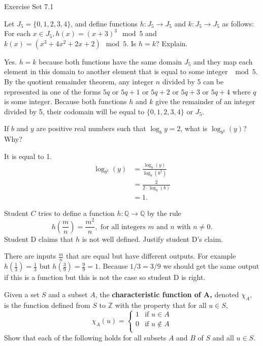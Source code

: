 \documentclass[12pt,letterpaper, onecolumn]{exam}
\begin{document}
	\centerline{Exercise Set 7.1}
\begin{questions}
	\setcounter{question}{13}\question Let $J_5=\{0,1,2,3,4\}$, and define functions $h:J_5\rightarrow J_5$ and $k:J_5 \rightarrow J_5$ as follows: For each $x\in J_5, h(x)=(x+3)^3\mod 5$ and $k(x)=(x^3+4x^2+2x+2)\mod5.$ Is $h=k$? Explain.
	\begin{solution}
		Yes. $h=k$ because both functions have the same domain $J_5$ and they map each element in this domain to another element that is equal to some integer $\mod 5$. By the quotient remainder theorem, any integer $n$ divided by $5$ can be represented in one of the forms $5q$ or $5q+1$ or $5q+2$ or $5q+3$ or $5q+4$ where $q$ is some integer. Because both functions $h$ and $k$ give the remainder of an integer divided by 5, their codomain will be equal to $\{0,1,2,3,4\}$ or $J_5$.
	\end{solution}
	\setcounter{question}{23}\question If $b$ and $y$ are positive real numbers such that $\log_b y=2$, what is $\log_{b^2}(y)$? Why?
	\begin{solution}
	It is equal to 1.
	\begin{align*}
		\log_{b^2}(y)&=\frac{\log_b(y)}{\log_b(b^2)}\\
		&=\frac{2}{2\cdot\log_b(b)}\\
		&=1.
	\end{align*}
	\end{solution}
	\setcounter{question}{27}\question Student $C$ tries to define a function $h: \mathbb{Q}\rightarrow\mathbb{Q}$ by the rule 
	$$h\left(\frac{m}{n}\right)=\frac{m^2}{n}, \text{ for all integers $m$ and $n$ with $n\neq0$.}$$
	Student D claims that $h$ is not well defined. Justify student D's claim.
	\begin{solution}
		There are inputs $\frac{m}{n}$ that are equal but have different outputs. For example $h\left(\frac{1}{3}\right)=\frac{1}{3}$ but $h\left(\frac{3}{9}\right)=\frac{9}{9}=1$. Because $1/3=3/9$ we should get the same output if this is a function but this is not the case so student D is right. 
	\end{solution}
	\setcounter{question}{42}\question Given a set $S$ and a subset $A$, the \textbf{characteristic function of A,} denoted $\chi_A,$ is the function defined from $S$ to $\mathbb{Z}$ with the property that for all $u\in S$,
	\begin{equation*}
	\chi_A(u)=
	\begin{cases}
		1 & \text{if } u\in A\\
		0 & \text{if } u\notin A\\
\end{cases}
\end{equation*}
Show that each of the following holds for all subsets $A$ and $B$ of $S$ and all $u\in S.$
\begin{parts}

\end{parts}
\end{questions}
\end{document}
